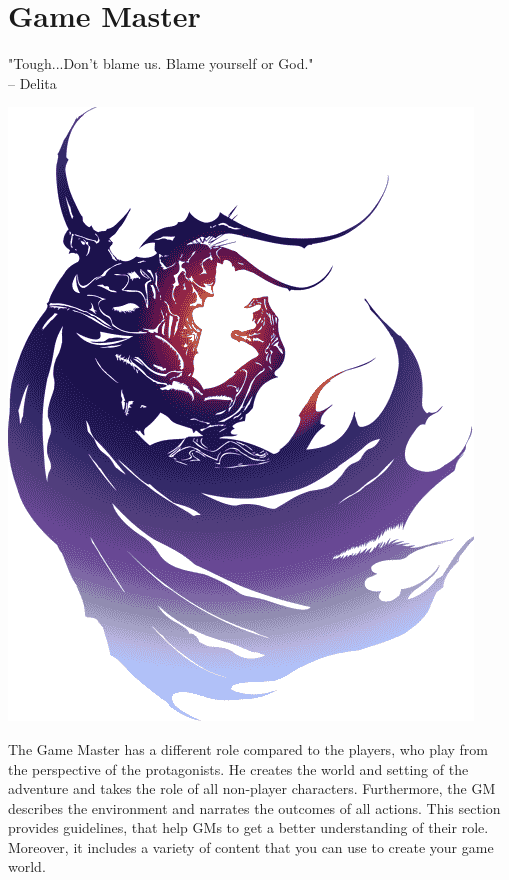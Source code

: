 \section*{\hypertarget{gm}{Game Master}}
"Tough...Don't blame us. Blame yourself or God."\\
\indent -- Delita

\begin{center} \includegraphics[width=\columnwidth]{./art/images/ff4.png} \end{center}
%
%
The Game Master has a different role compared to the players, who play from the perspective of the protagonists.
He creates the world and setting of the adventure and takes the role of all non-player characters.
Furthermore, the GM describes the environment and narrates the outcomes of all actions. 
This section provides guidelines, that help GMs to get a better understanding of their role.
Moreover, it includes a variety of content that you can use to create your game world.

